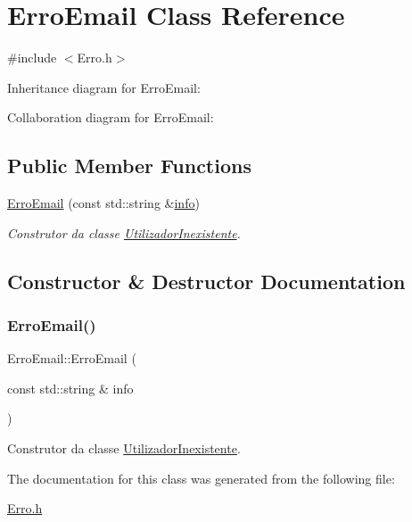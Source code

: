 \hypertarget{class_erro_email}{}\section{Erro\+Email Class Reference}
\label{class_erro_email}


{\ttfamily \#include $<$Erro.\+h$>$}



Inheritance diagram for Erro\+Email\+:


Collaboration diagram for Erro\+Email\+:
\subsection*{Public Member Functions}
\begin{DoxyCompactItemize}
\item 
\mbox{\hyperlink{class_erro_email_a536520637b17434e8fd8ab296db9e026}{Erro\+Email}} (const std\+::string \&\mbox{\hyperlink{class_erro_a3ecaaf6f8e15a0830a648035b456cb62}{info}})
\begin{DoxyCompactList}\small\item\em Construtor da classe \mbox{\hyperlink{class_utilizador_inexistente}{Utilizador\+Inexistente}}. \end{DoxyCompactList}\end{DoxyCompactItemize}


\subsection{Constructor \& Destructor Documentation}
\mbox{\label{class_erro_email_a536520637b17434e8fd8ab296db9e026}} 
\subsubsection{\texorpdfstring{Erro\+Email()}{ErroEmail()}}
{\footnotesize\ttfamily Erro\+Email\+::\+Erro\+Email (\begin{DoxyParamCaption}\item[{const std\+::string \&}]{info }\end{DoxyParamCaption})\hspace{0.3cm}{\ttfamily [inline]}}



Construtor da classe \mbox{\hyperlink{class_utilizador_inexistente}{Utilizador\+Inexistente}}. 



The documentation for this class was generated from the following file\+:\begin{DoxyCompactItemize}
\item 
\mbox{\hyperlink{_erro_8h}{Erro.\+h}}\end{DoxyCompactItemize}
